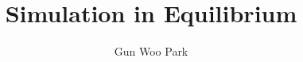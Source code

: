 \documentclass[slidestop, compress, mathserif]{beamer}
\title{Simulation in Equilibrium}
\author{Gun Woo Park}
\begin{document}
\begin{frame}[plain]
\maketitle
\end{frame}


\end{document}

